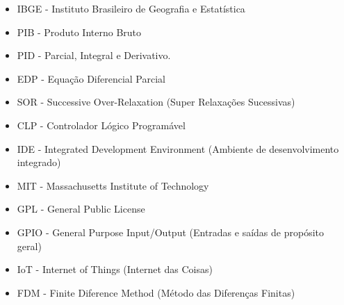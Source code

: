 \newpage

\label{siglas}


\begin{itemize}
  \item IBGE - Instituto Brasileiro de Geografia e Estatística
  \item PIB - Produto Interno Bruto
  \item PID - Parcial, Integral e Derivativo.
  \item EDP - Equação Diferencial Parcial
  \item SOR - Successive Over-Relaxation (Super Relaxações Sucessivas)
  \item CLP - Controlador Lógico Programável
  \item IDE - Integrated Development Environment (Ambiente de desenvolvimento integrado)
  \item MIT - Massachusetts Institute of Technology
  \item GPL - General Public License
  \item GPIO - General Purpose Input/Output (Entradas e saídas de propósito geral)
  \item IoT - Internet of Things (Internet das Coisas)
  \item FDM - Finite Diference Method (Método das Diferenças Finitas)
\end{itemize}